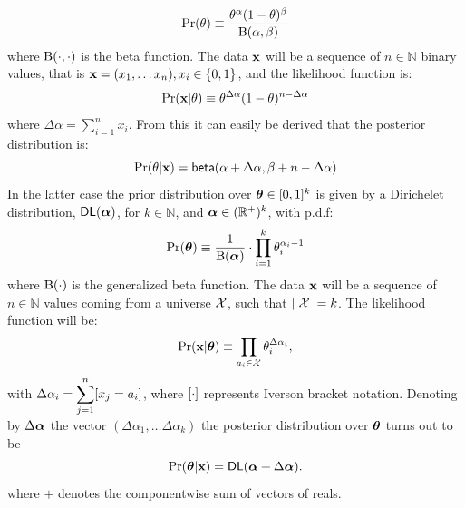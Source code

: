 \documentclass[sigconf]{acmart}
\begin{document}
\[
  \Pr(\theta)\equiv \frac{\theta^{\alpha} (1- \theta)^{\beta}}{\textup{B}(\alpha,\beta)}
\]
where $\textup{B}(\cdot,\cdot)$ is the beta function.
The data $\textbf{x}$ will be a sequence of $n\in\mathbb{N}$ binary values, that is $\textbf{x}= (x_1,\dots x_n), x_i\in\{0,1\}$, and the likelihood function is:
\[
  \Pr(\textbf{x} | \theta)\equiv \theta^{\Delta \alpha}(1-\theta)^{n - \Delta \alpha}
\]
where $\Delta \alpha = \displaystyle\sum_{i=1}^{n}x_i$.
From this it can easily be derived that the posterior distribution is:
\[
  \Pr(\theta|\textbf{x})=\mathsf{beta}(\alpha + \Delta \alpha,\beta + n - \Delta \alpha)
\]
In the latter case the prior distribution over $\boldsymbol{\theta}\in [0,1]^{k}$
is given by a Dirichelet distribution, $\mathsf{DL}(\boldsymbol{\alpha})$, for $k\in\mathbb{N}$,
and $\boldsymbol{\alpha}\in(\mathbb{R}^{+})^{k}$, with p.d.f:
\[
  \Pr(\boldsymbol{\theta})\equiv\frac{1}{\boldsymbol{\textup{B}}(\boldsymbol{\alpha})}\cdot \displaystyle\prod_{i=1}^{k}{\theta_i^{\alpha_i-1}}
\]
where $\boldsymbol{\textup{B}}(\cdot)$ is the generalized beta function.
The data $\textbf{x}$ will be a sequence of $n\in\mathbb{N}$ values
coming from a universe $\mathcal{X}$, such that $\mid\mathcal{X} \mid=k$.
The likelihood function will be:
\[
  \Pr(\textbf{x}|\boldsymbol{\theta})\equiv \displaystyle\prod_{a_i\in\mathcal{X}}\theta_{i}^{\Delta \alpha_i},
\]
with $\Delta \alpha_i=\displaystyle\sum_{j=1}^{n}[x_j=a_i]$, where $[\cdot]$ represents Iverson bracket notation.
Denoting by $\Delta\boldsymbol{\alpha}$ the vector $(\Delta\alpha_1,\dots \Delta\alpha_k)$ the posterior distribution over $\boldsymbol{\theta}$ turns out to be
\[
  \Pr(\boldsymbol{\theta}|\textbf{x})=\mathsf{DL}(\boldsymbol{\alpha}+\Delta \boldsymbol{\alpha}). 
\]
where $+$ denotes the componentwise sum of vectors of reals. 
\end{document}
